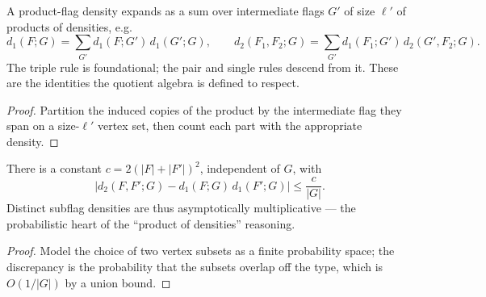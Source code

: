 \begin{theorem}
  \label{thm:density-chain-rules}
  \leanok
  A product-flag density expands as a sum over intermediate flags $G'$ of size
  $\ell'$ of products of densities, e.g.
  \[ d_1(F;G) = \sum_{G'} d_1(F;G')\, d_1(G';G), \qquad
     d_2(F_1,F_2;G) = \sum_{G'} d_1(F_1;G')\, d_2(G',F_2;G). \]
  The triple rule is foundational; the pair and single rules descend from it.
  These are the identities the quotient algebra is defined to respect.
\end{theorem}
\begin{proof}\leanok
  Partition the induced copies of the product by the intermediate flag they span
  on a size-$\ell'$ vertex set, then count each part with the appropriate
  density.
\end{proof}

\begin{theorem}
  \label{thm:density-prod-approx}
  \leanok
  There is a constant $c = 2(|F|+|F'|)^2$, independent of $G$, with
  \[ \bigl| d_2(F,F';G) - d_1(F;G)\, d_1(F';G) \bigr| \le \frac{c}{|G|}. \]
  Distinct subflag densities are thus asymptotically multiplicative --- the
  probabilistic heart of the ``product of densities'' reasoning.
\end{theorem}
\begin{proof}\leanok
  Model the choice of two vertex subsets as a finite probability space; the
  discrepancy is the probability that the subsets overlap off the type, which is
  $O(1/|G|)$ by a union bound.
\end{proof}
